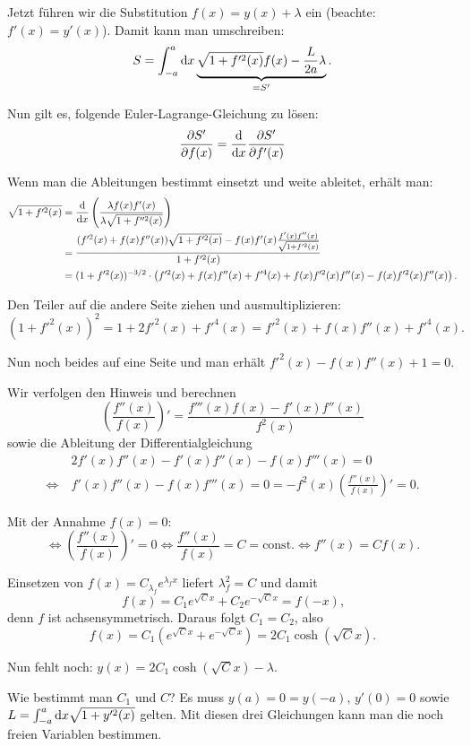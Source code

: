 Jetzt führen wir die Substitution $f(x) = y(x) + \lambda$ ein (beachte: $f'(x) = y'(x)$). Damit kann man umschreiben:
\[
	S = \int^a_{-a} \mathrm{d} x \underbrace{\sqrt{1 + f'^2(x)} f(x) - \frac{L}{2a} \lambda}_{= S'}
	\text{.}
\]

Nun gilt es, folgende Euler-Lagrange-Gleichung zu lösen:
\[
	\frac{\partial S'}{\partial f(x)} = \frac{\mathrm{d}}{\mathrm{d}x} \frac{\partial S'}{\partial f'(x)}
\]

Wenn man die Ableitungen bestimmt einsetzt und weite ableitet, erhält man:
\begin{align*}
	\sqrt{1 + f'^2(x)} 
	&= \frac{\mathrm{d}}{\mathrm{d}x} \left( \frac{\lambda f(x) f'(x)}{\lambda \sqrt{1 + f''^2(x)}} \right) \\
	&= \frac{(f'^2(x) + f(x) f''(x)) \sqrt{1 + f'^2(x)} - f(x) f'(x) \frac{f'(x) f''(x)}{\sqrt{1 + f'^2(x)}}}{1 + f'^2(x)} \\
	&= (1 + f'^2(x))^{-3/2} \cdot \left( f'^2(x) + f(x) f''(x) + f'^4(x) + f(x) f'^2(x) f''(x) - f(x) f'^2(x) f''(x) \right)
	\text{.}
\end{align*}

Den Teiler auf die andere Seite ziehen und ausmultiplizieren:
\[
	(1 + f'^2(x))^2 = 1 + 2 f'^2(x) + f'^4(x) = f'^2(x) + f(x) f''(x) + f'^4(x)
	\text{.}
\]

Nun noch beides auf eine Seite und man erhält $f'^2(x) - f(x) f''(x) + 1 = 0$.

Wir verfolgen den Hinweis und berechnen
\[
	\left( \frac{f''(x)}{f(x)} \right)' = \frac{f'''(x) f(x) - f'(x) f''(x)}{f^2(x)}
\]
sowie die Ableitung der Differentialgleichung
\begin{align*}
	&~ 2f'(x) f''(x) - f'(x) f''(x) - f(x) f'''(x) = 0 \\
	\Longleftrightarrow &~ f'(x) f''(x) - f(x) f'''(x) = 0 = -f^2(x) \left( \frac{f''(x)}{f(x)} \right)' = 0
	\text{.}
\end{align*}

Mit der Annahme $f(x) = 0$:
\[
	\Longleftrightarrow \left( \frac{f''(x)}{f(x)} \right)' = 0 \Longleftrightarrow \frac{f''(x)}{f(x)} = C = \text{const}. \Longleftrightarrow f''(x) = C f(x)
	\text{.}
\]

Einsetzen von $f(x) = C_{\lambda_f} e^{\lambda_f x}$ liefert $\lambda_f^2 = C$ und damit 
\[
	f(x) = C_1 e^{\sqrt{C}x} + C_2 e^{-\sqrt{C} x} = f(-x)
	\text{,}
\]
denn $f$ ist achsensymmetrisch. Daraus folgt $C_1 = C_2$, also 
\[
	f(x) = C_1 \left( e^{\sqrt{C} x} + e^{- \sqrt{C} x} \right) = 2 C_1 \cosh (\sqrt{C} x)
	\text{.}
\]

Nun fehlt noch: $y(x) = 2 C_1 \cosh(\sqrt{C} x) - \lambda$.

Wie bestimmt man $C_1$ und $C$? Es muss $y(a) = 0 = y(-a)$, $y'(0) = 0$ sowie $L = \int^a_{-a} \mathrm{d} x \sqrt{1 + y'^2(x)}$ gelten. Mit diesen drei Gleichungen kann man die noch freien Variablen bestimmen.